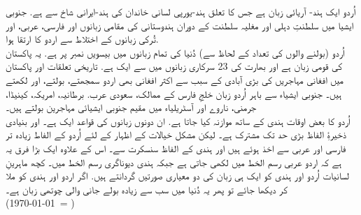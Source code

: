 \newfontfamily{}

\begin{urdu}
اُردو ایک ہند- آریائی زبان ہے جس کا تعلق ہند-یورپی لسانی خاندان کی ہند-ایرانی شاخ سے ہے.  جنوبی ایشیا میں سلطنتِ دہلی اور مغلیہ سلطنت کے دوران ہندوستانی کی مقامی زبانوں اور فارسی، عربی، اور تُرکی زبانوں کے اختلاط سے اردو کا ارتقا ہوا.\\

اُردو (بولنے والوں کی تعداد کے لحاظ سے) دُنیا کی تمام زبانوں میں بیسویں نمبر پر ہے. یہ پاکستان کی قومی زبان ہے اور بھارت کی 23 سرکاری زبانوں میں سے ایک ہے. تاریخی تعلقات اور پاکستان میں افغانی مہاجریں کی بڑی آبادی کے سبب سے اکثر افغانی بھی اردو سمجھتے، بولتے، اور لکھتے ہیں۔ جنوبی ایشیاء سے باہر اُردو زبان خلجِ فارس کے ممالک، سعودی عرب. برطانیہ، امریکہ، کینیڈا، جرمنی، ناروے اور آسٹریلیاء میں مقیم جنوبی ایشیائی مہاجرین بولتے ہیں۔\\

اُردو کا بعض اوقات ہندی کے ساتھ موازنہ کیا جاتا ہے. ان دونوں زبانوں کی قواعد ایک ہے۔ اور بنیادی ذخیرۂِ الفاظ بڑی حد تک مشترک ہے۔ لیکن مشکل خیالات کے اظہار کے لئے اُردو کے الفاط زیادہ تر فارسی اور عربی سے اخذ ہوئے ہیں اور ہندی کے الفاظ سنسکرت سے۔ اس کے علاوہ ایک بڑا فرق یہ ہے کہ اردو عربی رسم الخط میں لکھی جاتی ہے جبکہ ہندی دیوناگری رسم الخط میں۔ کچھ ماہرینِ لسانیات اُردو اور ہندی کو ایک ہی زبان کی دو معیاری صورتیں گردانتے ہیں. اگر اردو اور ہندی کو ملا کر دیکھا جائے تو پھر یہ دُنیا میں سب سے زیادہ بولے جانی والی چوتھی زبان ہے۔\\

(\today\ = \Hijritoday[0])
\end{urdu}

